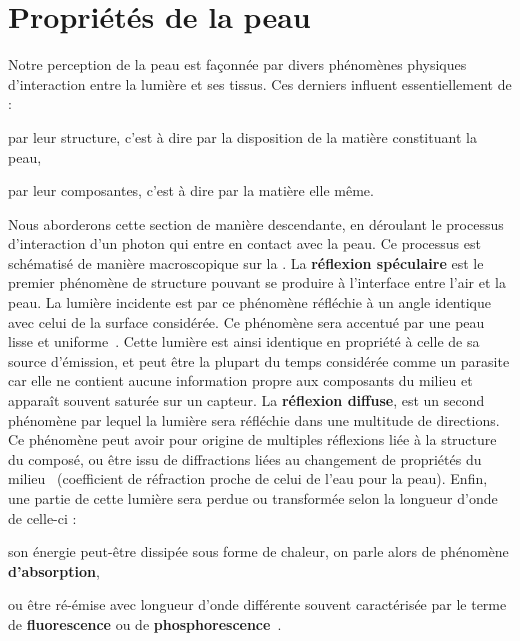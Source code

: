 \section{Propriétés de la peau}
Notre perception de la peau est façonnée par divers phénomènes physiques d'interaction entre la lumière et ses tissus. Ces derniers influent essentiellement de : 
\begin{inlinerate}
\item par leur structure, c'est à dire par la disposition de la matière constituant la peau,
\item par leur composantes, c'est à dire par la matière elle même.
\end{inlinerate}
Nous aborderons cette section de manière descendante, en déroulant le processus d'interaction d'un photon qui entre en contact avec la peau. Ce processus est schématisé de manière macroscopique sur la . La \textbf{réflexion spéculaire} est le premier phénomène de structure pouvant se produire à l'interface entre l'air et la peau. La lumière incidente est par ce phénomène réfléchie à un angle identique avec celui de la surface considérée. Ce phénomène sera accentué par une peau lisse et uniforme~\cite{Yang2009}. Cette lumière est ainsi identique en propriété à celle de sa source d'émission, et peut être la plupart du temps considérée comme un parasite car elle ne contient aucune information propre aux composants du milieu et apparaît souvent saturée sur un capteur. La \textbf{réflexion diffuse}, est un second phénomène par lequel la lumière sera réfléchie dans une multitude de directions. Ce phénomène peut avoir pour origine de multiples réflexions liée à la structure du composé, ou être issu de diffractions liées au changement de propriétés du milieu~\cite{Yang2009} (coefficient de réfraction proche de celui de l'eau pour la peau). Enfin, une partie de cette lumière sera perdue ou transformée selon la longueur d'onde de celle-ci :
\begin{inlinerate}
\item son énergie peut-être dissipée sous forme de chaleur, on parle alors de phénomène \textbf{d'absorption},
\item ou être ré-émise avec longueur d'onde différente souvent caractérisée par le terme de \textbf{fluorescence} ou de \textbf{phosphorescence}~\cite{Kollias2002}.
\end{inlinerate}\par

